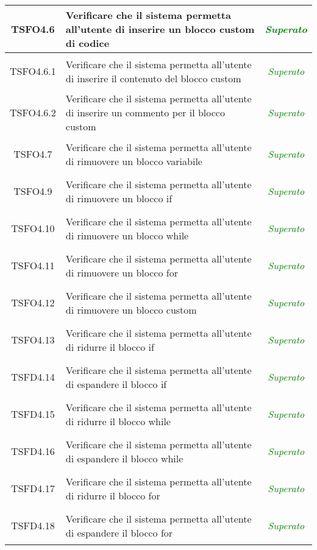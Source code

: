 \begin{longtable}{|c|>{}m{8cm}|c|}
\hypertarget{TSFO4.6}{TSFO4.6} & Verificare che il sistema permetta all'utente di inserire un blocco custom di codice & \textcolor{Green}{\textit{Superato}}\\ \hline
\hypertarget{TSFO4.6.1}{TSFO4.6.1} & Verificare che il sistema permetta all'utente di inserire il contenuto del blocco custom & \textcolor{Green}{\textit{Superato}}\\ \hline
\hypertarget{TSFO4.6.2}{TSFO4.6.2} & Verificare che il sistema permetta all'utente di inserire un commento per il blocco custom & \textcolor{Green}{\textit{Superato}}\\ \hline
\hypertarget{TSFO4.7}{TSFO4.7} & Verificare che il sistema permetta all'utente di rimuovere un blocco variabile & \textcolor{Green}{\textit{Superato}}\\ \hline
\hypertarget{TSFO4.9}{TSFO4.9} & Verificare che il sistema permetta all'utente di rimuovere un blocco if & \textcolor{Green}{\textit{Superato}}\\ \hline
\hypertarget{TSFO4.10}{TSFO4.10} & Verificare che il sistema permetta all'utente di rimuovere un blocco while & \textcolor{Green}{\textit{Superato}}\\ \hline
\hypertarget{TSFO4.11}{TSFO4.11} & Verificare che il sistema permetta all'utente di rimuovere un blocco for & \textcolor{Green}{\textit{Superato}}\\ \hline
\hypertarget{TSFO4.12}{TSFO4.12} & Verificare che il sistema permetta all'utente di rimuovere un blocco custom & \textcolor{Green}{\textit{Superato}}\\ \hline
\hypertarget{TSFO4.13}{TSFO4.13} & Verificare che il sistema permetta all'utente di ridurre il blocco if & \textcolor{Green}{\textit{Superato}}\\ \hline
\hypertarget{TSFD4.14}{TSFD4.14} & Verificare che il sistema permetta all'utente di espandere il blocco if & \textcolor{Green}{\textit{Superato}}\\ \hline
\hypertarget{TSFD4.15}{TSFD4.15} & Verificare che il sistema permetta all'utente di ridurre il blocco while & \textcolor{Green}{\textit{Superato}}\\ \hline
\hypertarget{TSFD4.16}{TSFD4.16} & Verificare che il sistema permetta all'utente di espandere il blocco while & \textcolor{Green}{\textit{Superato}}\\ \hline
\hypertarget{TSFD4.17}{TSFD4.17} & Verificare che il sistema permetta all'utente di ridurre il blocco for & \textcolor{Green}{\textit{Superato}}\\ \hline
\hypertarget{TSFD4.18}{TSFD4.18} & Verificare che il sistema permetta all'utente di espandere il blocco for & \textcolor{Green}{\textit{Superato}}\\ \hline

\end{longtable}
